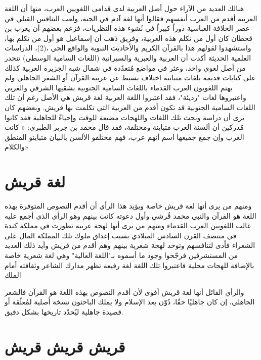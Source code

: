 \documentclass[12pt]{article}
\begin{document}
هنالك العديد من الآراء حول أصل العربية لدى قدامى اللغويين العرب، منها أن اللغة العربية أقدم من العرب أنفسهم فقالوا أنها لغة آدم في الجنة، ولعب التنافس القبلي في عصر الخلافة العباسية دوراً كبيراً في نُشوء هذه النظريات، فزعم بعضهم أن يعرب بن قحطان كان أول من تكلم هذه العربية، وفريق ذهب أن إسماعيل هو أول من تكلم بها، واستشهدوا لقولهم هذا بالقرآن الكريم والأحاديث النبوية والواقع الحي ،(2)، الدراسات العلمية الحديثة أكدت أن العربية والعبرية والسيرانية (اللغات السامية الوسطى) تنحدر من أصل لغوي واحد، وعثر في مواضع مُتعدّدة في شمال شبه الجزيرة العربية كذلك على كتابات قديمة بلغات متباينة اختلاف بسيط عن عربية القرآن أو الشعر الجاهلي ولم يهتم اللغويون العرب القدماء باللغات السامية الجنوبية بشقيها الشرقي والغربي واعتبروها لغات "رديئة"، فقد اعتبروا اللغة العربية لغة قريش هي الأصل رغم أن تلك اللغات السامية الجنوبية قد تكون أقدم من العربية التي تكلمت بها قريش. وبعضهم كان يرى أن دراسة وبحث تلك اللغات واللهجات مضيعة للوقت وإحياءً للجاهلية فقد كانوا مُدركين أن ألسنة العرب متباينة ومختلفة، فقد قال محمد بن جرير الطبري:
« كانت العرب وإن جمع جميعها اسم أنهم عرب، فهم مختلفو الألسن بالبيان متباينو المنطق والكلام»


\section{لغة قريش}

ومنهم من يرى أنها لغة قريش خاصة ويؤيد هذا الرأي أن أقدم النصوص المتوفرة بهذه اللغة هو القرآن والنبي محمد قُرشي وأول دعوته كانت بينهم وهو الرأي الذي أجمع عليه غالب اللغويين العرب القدماء
ومنهم من يرى أنها لهجة عربية تطورت في مملكة كندة في منتصف القرن السادس الميلادي بسبب إغداق ملوك تلك المملكة المال على الشعراء فأدى لتنافسهم وتوحد لهجة شعرية بينهم وهم أقدم من قريش وأيد ذلك العديد من المستشرقين فرجّحوا وجود ما أسموه بـ"اللغة العالية" وهي لغة شعرية خاصة بالإضافة للهجات محلية فاعتبروا تلك اللغة لغة رفيعة تظهر مدارك الشاعر وثقافته أمام الملك

والرأي القائل أنها لغة قريش أقوى لأن أقدم النصوص بهذه اللغة هو القرآن فالشعر الجاهلي، إن كان جاهليًا حقًا، دُوّن بعد الإسلام ولا يملك الباحثون نسخة أصلية لمُعلّقة أو قصيدة جاهلية ليُحدّد تاريخها بشكل دقيق.


\section{قريش قريش قريش}
\end{document}
